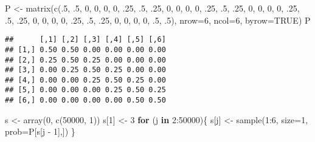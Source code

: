 \documentclass[
]{book}
\newenvironment{Shaded}{\begin{snugshade}}{\end{snugshade}}
\newcommand{\AttributeTok}[1]{\textcolor[rgb]{0.77,0.63,0.00}{#1}}
\newcommand{\ConstantTok}[1]{\textcolor[rgb]{0.00,0.00,0.00}{#1}}
\newcommand{\ControlFlowTok}[1]{\textcolor[rgb]{0.13,0.29,0.53}{\textbf{#1}}}
\newcommand{\DecValTok}[1]{\textcolor[rgb]{0.00,0.00,0.81}{#1}}
\newcommand{\FunctionTok}[1]{\textcolor[rgb]{0.00,0.00,0.00}{#1}}
\newcommand{\NormalTok}[1]{#1}
\newcommand{\OtherTok}[1]{\textcolor[rgb]{0.56,0.35,0.01}{#1}}
\newcommand{\SpecialCharTok}[1]{\textcolor[rgb]{0.00,0.00,0.00}{#1}}
\begin{document}
\begin{Shaded}
\begin{Highlighting}[]
\NormalTok{P }\OtherTok{\textless{}{-}} \FunctionTok{matrix}\NormalTok{(}\FunctionTok{c}\NormalTok{(.}\DecValTok{5}\NormalTok{, .}\DecValTok{5}\NormalTok{, }\DecValTok{0}\NormalTok{, }\DecValTok{0}\NormalTok{, }\DecValTok{0}\NormalTok{, }\DecValTok{0}\NormalTok{, }
\NormalTok{           .}\DecValTok{25}\NormalTok{, .}\DecValTok{5}\NormalTok{, .}\DecValTok{25}\NormalTok{, }\DecValTok{0}\NormalTok{, }\DecValTok{0}\NormalTok{, }\DecValTok{0}\NormalTok{, }
           \DecValTok{0}\NormalTok{, .}\DecValTok{25}\NormalTok{, .}\DecValTok{5}\NormalTok{, .}\DecValTok{25}\NormalTok{, }\DecValTok{0}\NormalTok{, }\DecValTok{0}\NormalTok{,}
           \DecValTok{0}\NormalTok{, }\DecValTok{0}\NormalTok{, .}\DecValTok{25}\NormalTok{, .}\DecValTok{5}\NormalTok{, .}\DecValTok{25}\NormalTok{, }\DecValTok{0}\NormalTok{, }
           \DecValTok{0}\NormalTok{, }\DecValTok{0}\NormalTok{, }\DecValTok{0}\NormalTok{, .}\DecValTok{25}\NormalTok{, .}\DecValTok{5}\NormalTok{, .}\DecValTok{25}\NormalTok{, }
           \DecValTok{0}\NormalTok{, }\DecValTok{0}\NormalTok{, }\DecValTok{0}\NormalTok{, }\DecValTok{0}\NormalTok{, .}\DecValTok{5}\NormalTok{, .}\DecValTok{5}\NormalTok{),}
           \AttributeTok{nrow=}\DecValTok{6}\NormalTok{, }\AttributeTok{ncol=}\DecValTok{6}\NormalTok{, }\AttributeTok{byrow=}\ConstantTok{TRUE}\NormalTok{)}
\NormalTok{ P}
\end{Highlighting}
\end{Shaded}

\begin{verbatim}
##      [,1] [,2] [,3] [,4] [,5] [,6]
## [1,] 0.50 0.50 0.00 0.00 0.00 0.00
## [2,] 0.25 0.50 0.25 0.00 0.00 0.00
## [3,] 0.00 0.25 0.50 0.25 0.00 0.00
## [4,] 0.00 0.00 0.25 0.50 0.25 0.00
## [5,] 0.00 0.00 0.00 0.25 0.50 0.25
## [6,] 0.00 0.00 0.00 0.00 0.50 0.50
\end{verbatim}

\begin{Shaded}
\begin{Highlighting}[]
\NormalTok{s }\OtherTok{\textless{}{-}} \FunctionTok{array}\NormalTok{(}\DecValTok{0}\NormalTok{, }\FunctionTok{c}\NormalTok{(}\DecValTok{50000}\NormalTok{, }\DecValTok{1}\NormalTok{))}
\NormalTok{s[}\DecValTok{1}\NormalTok{] }\OtherTok{\textless{}{-}} \DecValTok{3}
\ControlFlowTok{for}\NormalTok{ (j }\ControlFlowTok{in} \DecValTok{2}\SpecialCharTok{:}\DecValTok{50000}\NormalTok{)\{}
\NormalTok{   s[j] }\OtherTok{\textless{}{-}} \FunctionTok{sample}\NormalTok{(}\DecValTok{1}\SpecialCharTok{:}\DecValTok{6}\NormalTok{, }\AttributeTok{size=}\DecValTok{1}\NormalTok{, }\AttributeTok{prob=}\NormalTok{P[s[j }\SpecialCharTok{{-}} \DecValTok{1}\NormalTok{],])}
\NormalTok{\}}
\end{Highlighting}
\end{Shaded}
\end{document}
